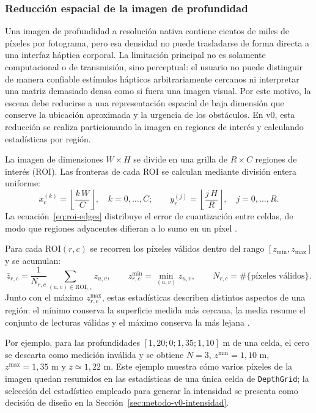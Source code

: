 \subsubsection{Reducción espacial de la imagen de profundidad}

Una imagen de profundidad a resolución nativa contiene cientos de miles de píxeles por fotograma,
pero esa densidad no puede trasladarse de forma directa a una interfaz háptica corporal. La
limitación principal no es solamente computacional o de transmisión, sino perceptual: el
usuario no puede distinguir de manera confiable estímulos hápticos arbitrariamente cercanos
ni interpretar una matriz demasiado densa como si fuera una imagen visual. Por este motivo, la
escena debe reducirse a una representación espacial de baja dimensión que conserve la
ubicación aproximada y la urgencia de los obstáculos. En v0, esta reducción se realiza
particionando la imagen en regiones de interés y calculando estadísticas por región.

La imagen de dimensiones $W\times H$ se divide en una grilla de $R\times C$ regiones de
interés (ROI). Las fronteras de cada ROI se calculan mediante división entera uniforme:
\begin{equation}
  x_c^{(k)} = \left\lfloor \frac{k\,W}{C} \right\rfloor,\quad k=0,\ldots,C;
  \qquad
  y_r^{(j)} = \left\lfloor \frac{j\,H}{R} \right\rfloor,\quad j=0,\ldots,R.
  \label{eq:roi-edges}
\end{equation}
La ecuación~\ref{eq:roi-edges} distribuye el error de cuantización entre celdas, de modo que
regiones adyacentes difieran a lo sumo en un píxel \cite{gonzalez2018digital}.

Para cada ROI$(r,c)$ se recorren los píxeles válidos dentro del rango $[z_{\min},z_{\max}]$ y
se acumulan:
\begin{equation}
  \bar{z}_{r,c} =
  \frac{1}{N_{r,c}}\sum_{(u,v)\in\text{ROI}_{r,c}} z_{u,v},
  \qquad
  z^{\min}_{r,c} = \min_{(u,v)} z_{u,v},
  \qquad
  N_{r,c} = \#\{\text{píxeles válidos}\}.
  \label{eq:cell-stats}
\end{equation}
Junto con el máximo $z^{\max}_{r,c}$, estas estadísticas describen distintos aspectos de una
región: el mínimo conserva la superficie medida más cercana, la media resume el conjunto de
lecturas válidas y el máximo conserva la más lejana
\cite{hornung2013octomap}.

Por ejemplo, para las profundidades $[1{,}20;0;1{,}35;1{,}10]$ m de una celda, el cero se
descarta como medición inválida y se obtiene $N=3$, $z^{\min}=1{,}10$ m,
$z^{\max}=1{,}35$ m y $\bar z\simeq1{,}22$ m. Este ejemplo muestra cómo varios píxeles de la
imagen quedan resumidos en las estadísticas de una única celda de \texttt{DepthGrid}; la
selección del estadístico empleado para generar la intensidad se presenta como decisión de
diseño en la Sección~\ref{sec:metodo-v0-intensidad}.

